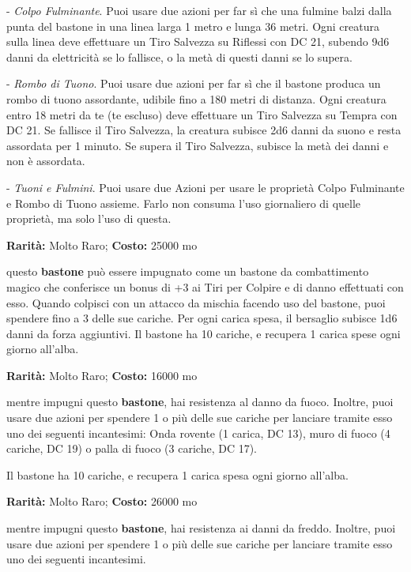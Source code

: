 \begin{multicols}{2}
- \emph{Colpo Fulminante}. Puoi usare due azioni per far sì che una fulmine balzi dalla punta del bastone in una linea larga 1 metro e lunga 36 metri. Ogni creatura sulla linea deve effettuare un Tiro Salvezza su Riflessi con DC 21, subendo 9d6 danni da elettricità se lo fallisce, o la metà di questi danni se lo supera.

- \emph{Rombo di Tuono}. Puoi usare due azioni per far sì che il bastone produca un rombo di tuono assordante, udibile fino a 180 metri di distanza. Ogni creatura entro 18 metri da te (te escluso) deve effettuare un Tiro Salvezza su Tempra con DC 21. Se fallisce il Tiro Salvezza, la creatura subisce 2d6 danni da suono e resta assordata per 1 minuto. Se supera il Tiro Salvezza, subisce la metà dei danni e non è assordata.

- \emph{Tuoni e Fulmini}. Puoi usare due Azioni per usare le proprietà Colpo Fulminante e Rombo di Tuono assieme. Farlo non consuma l'uso giornaliero di quelle proprietà, ma solo l'uso di questa.


\textbf{Rarità:} Molto Raro; \textbf{Costo:} 25000 mo

questo \textbf{bastone} può essere impugnato come un bastone da combattimento magico che conferisce un bonus di +3 ai Tiri per Colpire e di danno effettuati con esso. Quando colpisci con un attacco da mischia facendo uso del bastone, puoi spendere fino a 3 delle sue cariche. Per ogni carica spesa, il bersaglio subisce 1d6 danni da forza aggiuntivi. Il bastone ha 10 cariche, e recupera 1 carica spese ogni giorno all'alba.


\textbf{Rarità:} Molto Raro; \textbf{Costo:} 16000 mo

mentre impugni questo \textbf{bastone}, hai resistenza al danno da fuoco.
Inoltre, puoi usare due azioni per spendere 1 o più delle sue cariche per lanciare tramite esso uno dei seguenti incantesimi: Onda rovente (1 carica, DC 13), muro di fuoco (4 cariche, DC 19) o palla di fuoco (3 cariche, DC 17).

Il bastone ha 10 cariche, e recupera 1 carica spesa ogni giorno all'alba.


\textbf{Rarità:} Molto Raro; \textbf{Costo:} 26000 mo

mentre impugni questo \textbf{bastone}, hai resistenza ai danni da freddo.
Inoltre, puoi usare due azioni per spendere 1 o più delle sue cariche per lanciare tramite esso uno dei seguenti incantesimi.


\end{multicols}

